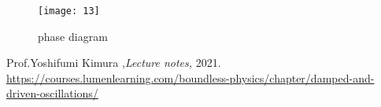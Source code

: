 \documentclass[12pt,a4paper]{article}
\begin{document}
\begin{figure}[H]
\texttt{[image: 13]}
\centering
\caption{phase diagram}
\label{fig 8}
\end{figure}
\newpage
\begin{thebibliography}{99}

   Prof.Yoshifumi Kimura  ,{\em Lecture notes,}  2021.\\
   \url{https://courses.lumenlearning.com/boundless-physics/chapter/damped-and-driven-oscillations/} 


\end{thebibliography}
\end{document}
